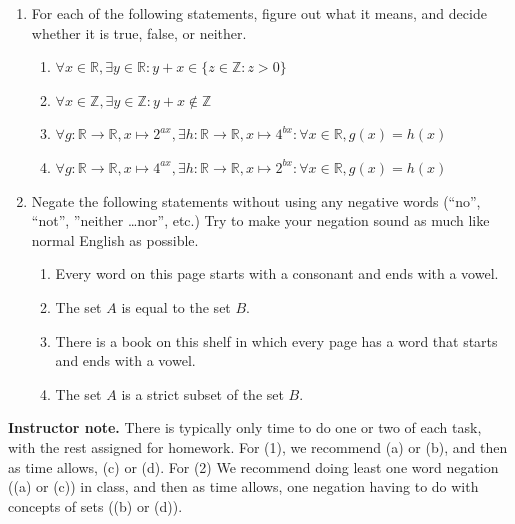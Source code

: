 \documentclass[11pt]{article}
\newcommand\smallnote[1]
	{\begin{mdframed}\raggedright  {\bf Instructor note.} {#1} \end{mdframed}}
\newenvironment{task}
	{\begin{mdframed}[linecolor=lightgray, linewidth=3pt]\raggedright}
	{\end{mdframed}}
\newcommand{\R}{\mathbb{R}}
\newcommand{\Z}{\mathbb{Z}}
\newcommand\st{:}
\theoremstyle{definition}
\begin{document}
\begin{task}
\begin{enumerate}
\item For each of the following statements, figure out what it means, and decide whether it is true, false, or neither. 
	 \begin{enumerate}
	 \item $\forall x\in \R, \exists y\in \R \st y+x\in\{z\in \Z \st z > 0\}$
	  \item $\forall x\in \Z, \exists y\in \Z \st y+x\notin \Z$
	 \item$\forall g:\R\to\R, x\mapsto 2^{ax},  \exists h:\R\to\R, x\mapsto 4^{bx} \st \forall x\in \R, g(x)=h(x)$
	  \item$\forall g:\R\to\R, x\mapsto 4^{ax},  \exists h:\R\to\R, x\mapsto 2^{bx} \st \forall x\in \R, g(x)=h(x)$
	 \end{enumerate}
\item Negate the following statements without using any negative words (``no'', ``not'', ''neither \dots nor'', etc.) Try to make your negation sound as much like normal English as possible. 
	\begin{enumerate}
	\item Every word on this page starts with a consonant and ends with a vowel.
	\item The set $A$ is equal to the set $B$.
	\item There is a book on this shelf in which every page has a word that starts and ends with a vowel.
	\item The set $A$ is a strict subset of the set $B$.
	\end{enumerate}
\end{enumerate}
\end{task}

\smallnote{There is typically only time to do one or two of each task, with the rest assigned for homework.  For (1), we recommend (a) or (b), and then as time allows, (c) or (d). For (2) We recommend doing least one word negation ((a) or (c)) in class, and then as time allows, one negation having to do with concepts of sets ((b) or (d)).}
\end{document}
